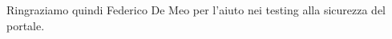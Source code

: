 \documentclass{article}
\begin{document}
Ringraziamo quindi Federico De Meo per l'aiuto nei testing alla sicurezza del portale.

\end{document}

